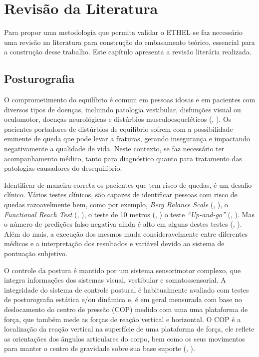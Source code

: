 \chapter{Revisão da Literatura}

Para propor uma metodologia que permita validar o ETHEL se faz necessário uma revisão na literatura para construção do embasamento teórico, essencial para a construção desse trabalho. Este capítulo apresenta a revisão literária realizada.

\section{Posturografia}

O comprometimento do equilíbrio é comum em pessoas idosas e em pacientes com diversos tipos de doenças, incluindo patologia vestibular, disfunções visual ou oculomotor, doenças neurológicas e distúrbios musculoesqueléticos (\citeauthor{visser2008clinical}, \citeyear{visser2008clinical}). Os pacientes portadores de distúrbios de equilíbrio sofrem com a possibilidade eminente de queda que pode levar a fraturas, gerando insegurança e impactando negativamente a qualidade de vida. Neste contexto, se faz necessário ter acompanhamento médico, tanto para diagnóstico quanto para tratamento das patologias causadores do desequilíbrio.

Identificar de maneira correta os pacientes que tem risco de quedas, é um desafio clínico. Vários testes clínicos, são capazes de identificar pessoas com risco de quedas razoavelmente bem, como por exemplo,  \textit{Berg Balance Scale} (\citeauthor{berg1992measuring}, \citeyear{berg1992measuring}), o \textit{Functional Reach Test} (\citeauthor{duncan1990functional}, \citeyear{duncan1990functional}), o teste de 10 metros  (\citeauthor{rossier2001validity}, \citeyear{rossier2001validity}) o teste \textit{“Up-and-go”}  (\citeauthor{podsiadlo1991timed}, \citeyear{podsiadlo1991timed}). Mas o número de predições falso-negativa ainda é alto em alguns destes testes (\citeauthor{bloem2006posture}, \citeyear{bloem2006posture}). Além do mais, a execução dos mesmos muda consideravelmente entre diferentes médicos e a interpretação dos resultados e variável devido ao sistema de pontuação subjetivo.

 O controle da postura é mantido por um sistema sensorimotor complexo, que integra informações dos sistemas visual, vestibular e somatossensorial. A integridade do sistema de controle postural é habitualmente avaliado com testes de posturografia estática e/ou dinâmica e, é em geral mensurada com base no deslocamento do centro de pressão (COP) medido com uma uma plataforma de força, que também mede as forças de reação vertical e horizontal. O COP é a localização da reação vertical na superfície de uma plataforma de força, ele reflete as orientações dos ângulos articulares do corpo, bem como os seus movimentos para manter o centro de gravidade sobre sua base suporte (\citeauthor{lafond2004intrasession}, \citeyear{lafond2004intrasession}).

